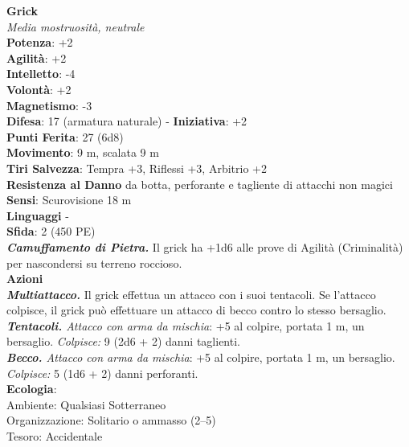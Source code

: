 \begin{multicols}{2}
\medskip\textbf{Grick}\\
\emph{Media mostruosità, neutrale}\\
\textbf{Potenza}: +2\\
\textbf{Agilità}: +2\\
\textbf{Intelletto}: -4\\
\textbf{Volontà}: +2\\
\textbf{Magnetismo}: -3\\
\textbf{Difesa}: 17 (armatura naturale) - \textbf{Iniziativa}: +2\\
\textbf{Punti Ferita}: 27 (6d8)\\
\textbf{Movimento}: 9 m, scalata 9 m\\
\textbf{Tiri Salvezza}: Tempra +3, Riflessi +3, Arbitrio +2\\
\textbf{Resistenza al Danno} da botta, perforante e tagliente di attacchi non magici\\
\textbf{Sensi}: Scurovisione 18 m\\
\textbf{Linguaggi} -\\
\textbf{Sfida}: 2 (450 PE)\smallskip\\
\emph{\textbf{Camuffamento di Pietra.}} Il grick ha +1d6 alle prove di Agilità (Criminalità) per nascondersi su terreno roccioso.\\
\smallskip\textbf{Azioni}\\
\emph{\textbf{Multiattacco.}} Il grick effettua un attacco con i suoi tentacoli. Se l'attacco colpisce, il grick può effettuare un attacco di becco contro lo stesso bersaglio.\\
\emph{\textbf{Tentacoli.} Attacco con arma da mischia}: +5 al colpire, portata 1 m, un bersaglio.
\emph{Colpisce:} 9 (2d6 + 2) danni taglienti.\\
\emph{\textbf{Becco.} Attacco con arma da mischia}: +5 al colpire, portata 1 m, un bersaglio.
\emph{Colpisce:} 5 (1d6 + 2) danni perforanti.\\
\textbf{Ecologia}: \\
Ambiente: Qualsiasi Sotterraneo\\
Organizzazione: Solitario o ammasso (2–5)\\
Tesoro: Accidentale\\


\end{multicols}
